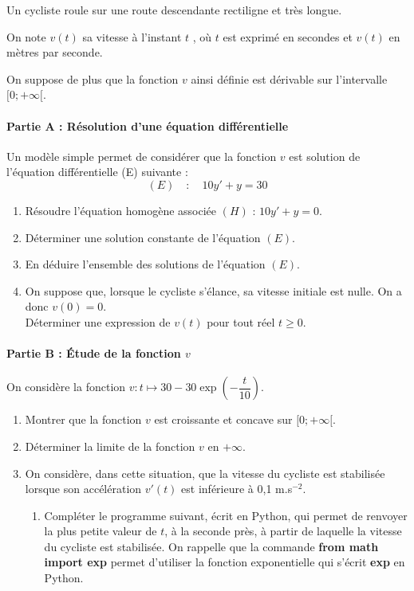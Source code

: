 \documentclass[11pt,fleqn, openany]{book} %
\begin{document}
\begin{exercise}

    Un cycliste roule sur une route descendante rectiligne et très longue. 
    
    On note $v(t)$ sa vitesse à l'instant $t$ , où $t$ est exprimé en secondes et $v(t)$ en mètres par seconde.

On suppose de plus que la fonction $v$ ainsi définie est dérivable sur l'intervalle $[0;+\infty [$.


\paragraph{Partie A : Résolution d'une équation différentielle}

Un modèle simple permet de considérer que la fonction $v$ est solution de l'équation différentielle (E) suivante :
\[(E) \quad : \quad 10y'+y=30\]

\begin{enumerate}
    \item Résoudre l'équation homogène associée $(H)$ : $10y'+y=0$.
    \item Déterminer une solution constante de l'équation $(E)$.
    \item En déduire l'ensemble des solutions de l'équation $(E)$.
    \item On suppose que, lorsque le cycliste s'élance, sa vitesse initiale est nulle. On a donc $v(0) = 0$. \\ Déterminer une expression de $v(t)$ pour tout réel $t\geqslant 0$.
\end{enumerate}

\paragraph{Partie B : Étude de la fonction $v$}

On considère la fonction $v:t\mapsto 30-30\exp\left(-\dfrac{t}{10}\right)$.
\begin{enumerate}
    \item Montrer que la fonction $v$ est croissante et concave sur $[0;+\infty[$.
    \item Déterminer la limite de la fonction $v$ en $+\infty$.
    \item On considère, dans cette situation, que la vitesse du cycliste est stabilisée lorsque son accélération $v'(t)$ est inférieure à 0,1 m.s$^{-2}$. 
\begin{enumerate}
\item Compléter le programme suivant, écrit en Python, qui permet de renvoyer la plus petite valeur de $t$, à la seconde près, à partir de laquelle la vitesse du cycliste est stabilisée. On rappelle que la commande \textbf{from math import exp }permet d'utiliser la fonction exponentielle qui s'écrit \textbf{exp} en Python.


\end{enumerate}
\end{enumerate}
\end{exercise}
\end{document}
